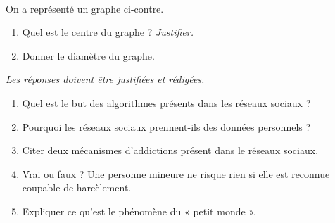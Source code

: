 \documentclass[11pt]{article}
\begin{document}
\begin{exo}[$2$ points]~\\[-1.5cm]
  \begin{minipage}{.5\textwidth}
    On a représenté un graphe ci-contre.
    \begin{enumerate}
      \item Quel est le centre du graphe ? \emph{Justifier.}
      \item Donner le diamètre du graphe.
    \end{enumerate}
  \end{minipage}
  \begin{minipage}{.5\textwidth}
\end{minipage}
\end{exo}

\begin{exo}[$5$ points]
  \emph{Les réponses doivent être justifiées et rédigées.}
  \begin{enumerate}
    \item Quel est le but des algorithmes présents dans les réseaux sociaux ?
    \item Pourquoi les réseaux sociaux prennent-ils des données personnels ?
    \item Citer deux mécanismes d'addictions présent dans le réseaux sociaux.
    \item Vrai ou faux ? Une personne mineure ne risque rien si elle est
      reconnue coupable de harcèlement.
    \item Expliquer ce qu'est le phénomène du « petit monde ».
  \end{enumerate}
\end{exo}
\end{document}
